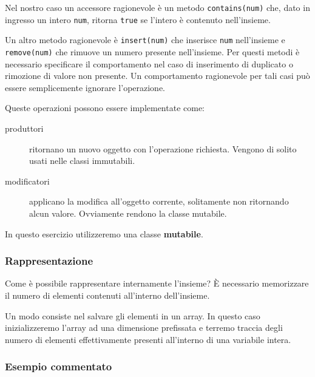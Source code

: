 \documentclass{article}
\begin{document}
Nel nostro caso un accessore ragionevole è un metodo \texttt{contains(num)} che,
dato in ingresso un intero \texttt{num}, ritorna \texttt{true} se l'intero è contenuto nell'insieme.

Un altro metodo ragionevole è \texttt{insert(num)} che inserisce \texttt{num} nell'insieme
e \texttt{remove(num)} che rimuove un numero presente nell'insieme.
Per questi metodi è necessario specificare il comportamento nel caso di
inserimento di duplicato o rimozione di valore non presente.
Un comportamento ragionevole per tali casi può essere semplicemente ignorare l'operazione.

Queste operazioni possono essere implementate come:
\begin{description}
	\item[produttori] ritornano un nuovo oggetto con l'operazione richiesta. Vengono di solito usati nelle classi immutabili.
	\item[modificatori] applicano la modifica all'oggetto corrente, solitamente non ritornando alcun valore. Ovviamente rendono la classe mutabile.
\end{description}
In questo esercizio utilizzeremo una classe \textbf{mutabile}.

\subsubsection{Rappresentazione}

Come è possibile rappresentare internamente l'insieme?
È necessario memorizzare il numero di elementi contenuti all'interno dell'insieme.

Un modo consiste nel salvare gli elementi in un array.
In questo caso inizializzeremo l'array ad una dimensione prefissata
e terremo traccia degli numero di elementi effettivamente presenti all'interno di una variabile intera.

\subsubsection{Esempio commentato}
\end{document}
